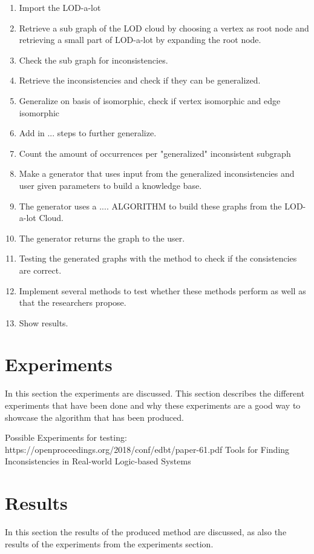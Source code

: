 \documentclass{article}
\begin{document}
\begin{enumerate}
	\item Import the LOD-a-lot %
	\item Retrieve a sub graph of the LOD cloud by choosing a vertex as root node and retrieving a small part of LOD-a-lot by expanding the root node. %
	\item Check the sub graph for inconsistencies. %
	\item Retrieve the inconsistencies and check if they can be generalized. %
	\item Generalize on basis of isomorphic, check if vertex isomorphic and edge isomorphic %
	\item Add in ... steps to further generalize. %
	\item Count the amount of occurrences per "generalized" inconsistent subgraph %
	\item Make a generator that uses input from the generalized inconsistencies and user given parameters to build a knowledge base. %
	\item The generator uses a .... ALGORITHM to build these graphs from the LOD-a-lot Cloud. %
	\item The generator returns the graph to the user. %
	\item Testing the generated graphs with the method to check if the consistencies are correct. %
	\item Implement several methods to test whether these methods perform as well as that the researchers propose. %
	\item Show results. %
\end{enumerate}


\newpage
\section{Experiments}
In this section the experiments are discussed. This section describes the different experiments that have been done and why these experiments are a good way to showcase the algorithm that has been produced.


Possible Experiments for testing:
https://openproceedings.org/2018/conf/edbt/paper-61.pdf
Tools for Finding Inconsistencies in Real-world Logic-based Systems


\newpage
\section{Results}
In this section the results of the produced method are discussed, as also the results of the experiments from the experiments section.
\end{document}
